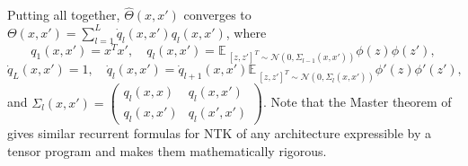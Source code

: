 \documentclass{article}
\newcommand{\EE}{\mathbb{E}\,}
\newcommand{\NN}{\mathcal{N}}
\begin{document}
    Putting all together, $\hat\Theta(x,x')$ converges to $\Theta(x,x') = \sum_{l=1}^L \dot q_l(x,x') q_l(x,x')$, where
    \begin{equation}
        q_1(x,x') = x^T x',
        \quad
        q_l(x,x') = \EE_{[z,z']^T \sim \NN(0,\Sigma_{l-1}(x,x'))} \phi(z) \phi(z'),
    \end{equation}
    \begin{equation}
        \dot q_L(x,x') = 1, 
        \quad
        \dot q_l(x,x') = \dot q_{l+1}(x,x') \EE_{[z,z']^T \sim \NN(0,\Sigma_l(x,x'))} \phi'(z) \phi'(z'),
    \end{equation}
    and $\Sigma_l(x,x') = \begin{pmatrix} q_l(x,x) & q_l(x,x')\\q_l(x,x') & q_l(x',x') \end{pmatrix}$.
    Note that the Master theorem of \cite{yang2020tensor_ii} gives similar recurrent formulas for NTK of any architecture expressible by a tensor program and makes them mathematically rigorous.
\end{document}
